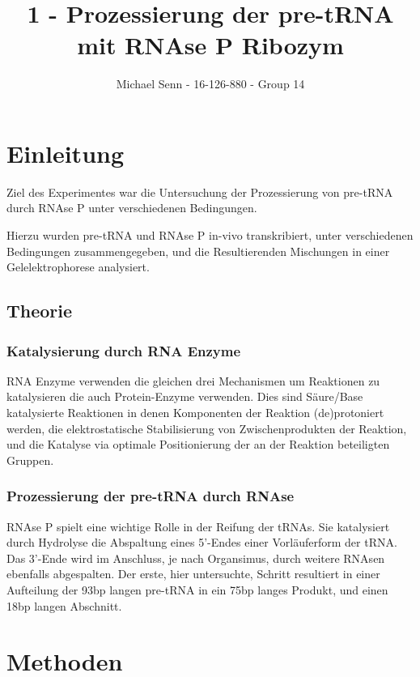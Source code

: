 \documentclass[a4paper,english]{scrreprt}
\title{1 - Prozessierung der pre-tRNA mit RNAse P Ribozym}
\author{Michael Senn \maillink{michael.senn@students.unibe.ch} - 16-126-880 - Group 14}
\date{\printdate}
\begin{document}
\maketitle

\chapter{Einleitung}

Ziel des Experimentes war die Untersuchung der Prozessierung von pre-tRNA durch
RNAse P unter verschiedenen Bedingungen.

Hierzu wurden pre-tRNA und RNAse P in-vivo transkribiert, unter verschiedenen
Bedingungen zusammengegeben, und die Resultierenden Mischungen in einer
Gelelektrophorese analysiert.

\section{Theorie}

\subsection{Katalysierung durch RNA Enzyme}

RNA Enzyme verwenden die gleichen drei Mechanismen um Reaktionen zu
katalysieren die auch Protein-Enzyme verwenden. Dies sind Säure/Base
katalysierte Reaktionen in denen Komponenten der Reaktion (de)protoniert
werden, die elektrostatische Stabilisierung von Zwischenprodukten der Reaktion,
und die Katalyse via optimale Positionierung der an der Reaktion beteiligten
Gruppen.

\subsection{Prozessierung der pre-tRNA durch RNAse}

RNAse P spielt eine wichtige Rolle in der Reifung der tRNAs. Sie katalysiert
durch Hydrolyse die Abspaltung eines 5'-Endes einer Vorläuferform der tRNA. Das
3'-Ende wird im Anschluss, je nach Organsimus, durch weitere RNAsen ebenfalls
abgespalten. Der erste, hier untersuchte, Schritt resultiert in einer
Aufteilung der 93bp langen pre-tRNA in ein 75bp langes Produkt, und einen 18bp
langen Abschnitt.

\chapter{Methoden}
\end{document}
